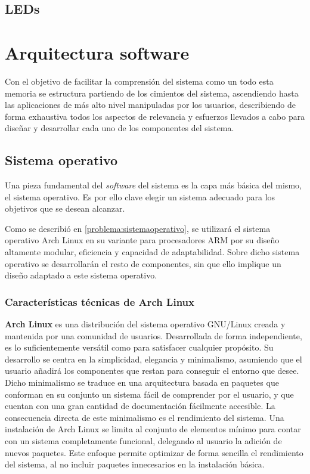 \subsection{LEDs}
\citationneeded

\section{Arquitectura software}

Con el objetivo de facilitar la comprensión del sistema como un todo esta memoria se estructura partiendo de los cimientos del sistema, ascendiendo hasta las aplicaciones de más alto nivel manipuladas por los usuarios, describiendo de forma exhaustiva todos los aspectos de relevancia y esfuerzos llevados a cabo para diseñar y desarrollar cada uno de los componentes del sistema.

\subsection{Sistema operativo}

Una pieza fundamental del \textit{software} del sistema es la capa más básica del mismo, el sistema operativo. Es por ello clave elegir un sistema adecuado para los objetivos que se desean alcanzar.

Como se describió en \ref{problema:sistemaoperativo}, se utilizará el sistema operativo Arch Linux en su variante para procesadores ARM por su diseño altamente modular, eficiencia y capacidad de adaptabilidad. Sobre dicho sistema operativo se desarrollarán el resto de componentes, sin que ello implique un diseño adaptado a este sistema operativo.

\subsubsection{Características técnicas de Arch Linux}
\label{archlinux:description}

\textbf{Arch Linux} es una distribución del sistema operativo GNU/Linux creada y mantenida por una comunidad de usuarios. Desarrollada de forma independiente, es lo suficientemente versátil como para satisfacer cualquier propósito. Su desarrollo se centra en la simplicidad, elegancia y minimalismo, asumiendo que el usuario añadirá los componentes que restan para conseguir el entorno que desee. Dicho minimalismo se traduce en una arquitectura basada en paquetes que conforman en su conjunto un sistema fácil de comprender por el usuario, y que cuentan con una gran cantidad de documentación fácilmente accesible. La consecuencia directa de este minimalismo es el rendimiento del sistema. Una instalación de Arch Linux se limita al conjunto de elementos mínimo para contar con un sistema completamente funcional, delegando al usuario la adición de nuevos paquetes. Este enfoque permite optimizar de forma sencilla el rendimiento del sistema, al no incluir paquetes innecesarios en la instalación básica.

